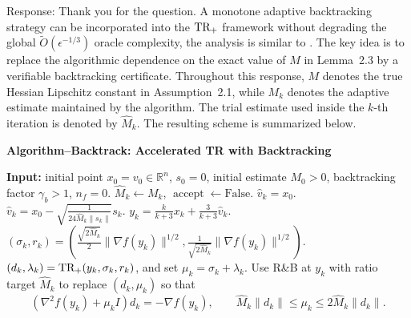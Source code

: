 \begin{itemize}
          {
              \color{blue}
              Response: Thank you for the question. A monotone adaptive backtracking strategy can be incorporated into the \(\textrm{TR}_+\) framework without degrading the global \(\widetilde O(\epsilon^{-1/3})\) oracle complexity, the analysis is similar to \cite{jiang2020unified,he2025history}. The key idea is to replace the algorithmic dependence on the exact value of \(M\) in Lemma~2.3 by a verifiable backtracking certificate. Throughout this response, \(M\) denotes the true Hessian Lipschitz constant in Assumption~2.1, while \(M_k\) denotes the adaptive estimate maintained by the algorithm. The trial estimate used inside the \(k\)-th iteration is denoted by \(\widehat M_k\). The resulting scheme is summarized below.
              \begin{algorithm}[htbp]
                  \noindent\textbf{Algorithm--Backtrack: Accelerated TR with Backtracking}
                  \begin{algorithmic}[1]
                      \STATE \textbf{Input:} initial point \(x_0=v_0\in \mathbb{R}^n\), \(s_0=0\), initial estimate \(M_0>0\), backtracking factor \(\gamma_b>1\), \(n_f=0\).
                      \STATE \(\widehat M_k\leftarrow M_k\), \(\operatorname{accept}\leftarrow \mathrm{False}\).
                      \STATE \(\widehat v_k=x_0\).
                      \ELSE
                      \STATE \(\displaystyle \widehat v_k=x_0-\sqrt{\frac{1}{24\widehat M_k\|s_k\|}}s_k\).
                      \ENDIF
                      \STATE \(\displaystyle y_k=\frac{k}{k+3}x_k+\frac{3}{k+3}\widehat v_k\).
                      \STATE \(\displaystyle
                      (\sigma_k,r_k)
                      =
                      \left(
                      \frac{\sqrt{2\widehat M_k}}{2}\|\nabla f(y_k)\|^{1/2},
                      \frac{1}{\sqrt{2\widehat M_k}}\|\nabla f(y_k)\|^{1/2}
                      \right).
                      \)
                      \label{line.adaptive-set-params}
                      \STATE \((d_k,\lambda_k)=\textrm{TR}_+(y_k,\sigma_k,r_k)\), and set \(\mu_k=\sigma_k+\lambda_k\).
                      \STATE Use R\&B at \(y_k\) with ratio target \(\widehat M_k\) to replace \((d_k,\mu_k)\) so that
                      \[
                          (\nabla^2 f(y_k)+\mu_k I)d_k=-\nabla f(y_k),
                          \qquad
                          \widehat M_k\|d_k\|\le \mu_k\le 2\widehat M_k\|d_k\|.
\]
\end{algorithmic}
\end{algorithm}}
\end{itemize}
